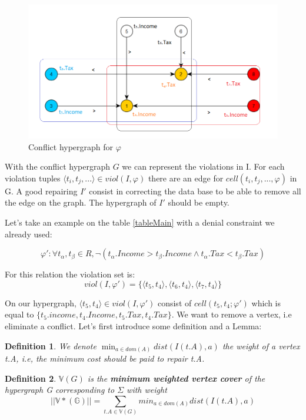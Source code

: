 \documentclass[letterpaper, 12pt]{report}
\newtheorem{mydef}{Definition}
\begin{document}
\begin{figure}
 \centering
\hspace*{-1.8cm} \includegraphics[scale=1]{img/grapht4.png}
 \caption{\label{grapht4} Conflict hypergraph for $\varphi$}
\end{figure}

With the conflict hypergraph $G$ we can represent the violations in I. For each violation tuples $ \langle t_i,t_j,...\rangle \in viol(I,\varphi)$ there are an edge for $cell(t_i,t_j,...,\varphi)$ in G. A good repairing $I'$ consist in correcting the data base to be able to remove all the edge on the graph. The hypergraph of $I'$ should be empty.

Let's take an example on the table \ref{tableMain} with a denial constraint we already used:

$$\varphi': \forall t_\alpha,t_\beta \in R , \neg(t_\alpha.Income > t_\beta.Income \wedge t_\alpha.Tax < t_\beta.Tax)$$

For this relation the violation set is:
 $$ viol(I,\varphi') = \{ \langle t_5,t_4 \rangle,\langle t_6,t_4 \rangle,\langle t_7,t_4 \rangle \}$$

On our hypergraph, $\langle t_5,t_4 \rangle \in viol(I,\varphi')$ consist of $cell(t_5,t_4;\varphi')$ which is equal to $\{ t_5.income,t_4.Income,t_5.Tax,t_4.Tax\}$. We want to remove a vertex, i.e eliminate a conflict. Let's first introduce some definition and a Lemma: \cite{main}

\begin{mydef}
	We denote $ \min_{a \in dom(A)} dist(I(t.A),a) $ the weight of a vertex t.A, i.e, the minimum cost should be paid to repair t.A.
\end{mydef}

\begin{mydef}
	$\mathbb{V}(G)$ is the \textbf{minimum weighted vertex cover} of the hypergraph G corresponding to $\Sigma$ with weight
	$$||\mathbb{V*(G)}|| = \sum_{t.A \in \mathbb{V}(G)} min_{a\in dom(A)} dist(I(t.A),a)$$
\end{mydef}
\end{document}
